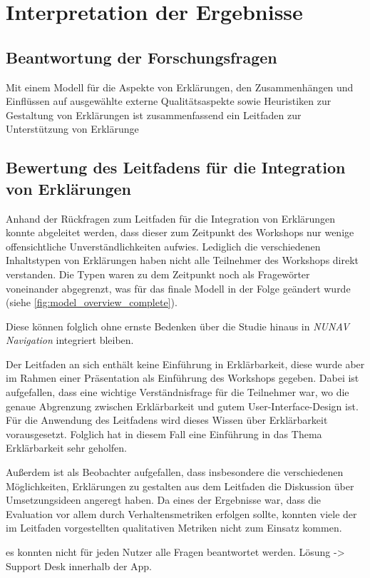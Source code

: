 \section{Interpretation der Ergebnisse}

\subsection*{Beantwortung der Forschungsfragen}

Mit einem Modell für die Aspekte von Erklärungen, den Zusammenhängen und Einflüssen auf ausgewählte externe Qualitätsaspekte sowie Heuristiken zur Gestaltung von Erklärungen ist zusammenfassend ein Leitfaden zur Unterstützung von Erklärunge

\subsection*{Bewertung des Leitfadens für die Integration von Erklärungen}

Anhand der Rückfragen zum Leitfaden für die Integration von Erklärungen konnte abgeleitet werden, dass dieser zum Zeitpunkt des Workshops nur wenige offensichtliche Unverständlichkeiten aufwies. Lediglich die verschiedenen Inhaltstypen von Erklärungen haben nicht alle Teilnehmer des Workshops direkt verstanden. Die Typen waren zu dem Zeitpunkt noch als Fragewörter voneinander abgegrenzt, was für das finale Modell in der Folge geändert wurde (siehe \autoref{fig:model_overview_complete}).

Diese können folglich ohne ernste Bedenken über die Studie hinaus in \textit{NUNAV Navigation} integriert bleiben.

Der Leitfaden an sich enthält keine Einführung in Erklärbarkeit, diese wurde aber im Rahmen einer Präsentation als Einführung des Workshops gegeben. Dabei ist aufgefallen, dass eine wichtige Verständnisfrage für die Teilnehmer war, wo die genaue Abgrenzung zwischen Erklärbarkeit und gutem User-Interface-Design ist. Für die Anwendung des Leitfadens wird dieses Wissen über Erklärbarkeit vorausgesetzt. Folglich hat in diesem Fall eine Einführung in das Thema Erklärbarkeit sehr geholfen.

Außerdem ist als Beobachter aufgefallen, dass insbesondere die verschiedenen Möglichkeiten, Erklärungen zu gestalten aus dem Leitfaden die Diskussion über Umsetzungsideen angeregt haben. Da eines der Ergebnisse war, dass die Evaluation vor allem durch Verhaltensmetriken erfolgen sollte, konnten viele der im Leitfaden vorgestellten qualitativen Metriken nicht zum Einsatz kommen.

es konnten nicht für jeden Nutzer alle Fragen beantwortet werden. Lösung -> Support Desk innerhalb der App.